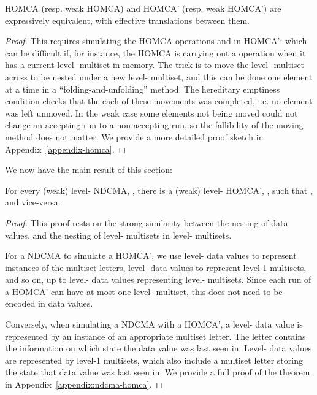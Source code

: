 \begin{theorem}
HOMCA (resp. weak HOMCA) and HOMCA' (resp. weak HOMCA') are expressively equivalent, with effective translations between them.
\end{theorem}
\begin{proof}
This requires simulating the HOMCA operations  and  in HOMCA': which can be difficult if, for instance, the HOMCA is carrying out a  operation when it has a current level- multiset in memory.  The trick is to move the level- multiset across to be nested under a new level- multiset, and this can be done one element at a time in a ``folding-and-unfolding'' method.  The hereditary emptiness condition checks that the each of these movements was completed, i.e. no element was left unmoved. In the weak case some elements not being moved could not change an accepting run to a non-accepting run, so the fallibility of the moving method does not matter.   We provide a more detailed proof sketch in Appendix~\ref{appendix-homca}.
\end{proof}

We now have the main result of this section:
\begin{theorem}\label{thm:ndcma-homca-equivalence}
For every (weak) level- NDCMA, , there is a (weak) level- HOMCA', , such that , and vice-versa. 
\end{theorem}
\begin{proof}
This proof rests on the strong similarity between the nesting of data values, and the nesting of level- multisets in level- multisets.  

For a NDCMA to simulate a HOMCA', we use level- data values to represent instances of the multiset letters, level- data values to represent level-1 multisets, and so on, up to level- data values representing level- multisets.  Since each run of a HOMCA' can have at most one level- multiset, this does not need to be encoded in data values.  

Conversely, when simulating a NDCMA with a HOMCA', a level- data value is represented by an instance of an appropriate multiset letter.  The letter contains the information on which state the data value was last seen in.  Level- data values are represented by level-1 multisets, which also include a multiset letter storing the state that data value was last seen in.  We provide a full proof of the theorem in Appendix~\ref{appendix:ndcma-homca}.
\end{proof}





